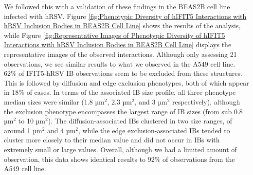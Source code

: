 We followed this with a validation of these findings in the BEAS2B cell line infected with hRSV. Figure \ref{fig:Phenotypic Diversity of hIFIT5 Interactions with hRSV Inclusion Bodies in BEAS2B Cell Line} shows the results of the analysis, while Figure \ref{fig:Representative Images of Phenotypic Diversity of hIFIT5 Interactions with hRSV Inclusion Bodies in BEAS2B Cell Line} displays the representative images of the observed interactions. Although only assessing 21 observations, we see similar results to what we observed in the A549 cell line. 62\% of IFIT5-hRSV IB observations seem to be excluded from these structures. This is followed by diffusion and edge exclusion phenotypes, both of which appear in 18\% of cases. In terms of the associated IB size profile, all three phenotype median sizes were similar (1.8 \(\mbox{µm}^2\), 2.3 \(\mbox{µm}^2\), and 3 \(\mbox{µm}^2\) respectively), although the exclusion phenotype encompasses the largest range of IB sizes (from sub 0.8 \(\mbox{µm}^2\) to 10 \(\mbox{µm}^2\)). The diffusion-associated IBs clustered in two size ranges, of around 1 \(\mbox{µm}^2\) and 4 \(\mbox{µm}^2\), while the edge exclusion-associated IBs tended to cluster more closely to their median value and did not occur in IBs with extremely small or large values. Overall, although we had a limited amount of observation, this data shows identical results to 92\% of observations from the A549 cell line.

